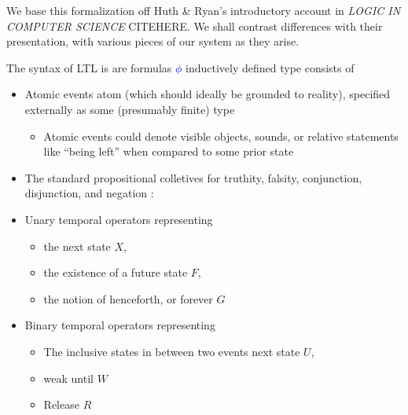 \documentclass[a4paper, 11pt]{article}
\newcommand{\blue}[1]{\textcolor{blue}{#1}}
\newcommand{\green}[1]{\textcolor{hooker\'sgreen}{#1}}
\begin{document}
We base this formalization off Huth \& Ryan's introductory account in
\emph{LOGIC IN COMPUTER SCIENCE} CITEHERE. We shall contrast differences with
their presentation, with various pieces of our system as they arise.

The syntax of LTL is are formulas \blue{$\phi$} inductively defined type consists of

\begin{itemize}
\item Atomic events \green{atom} (which should ideally be grounded to reality), specified externally as some (presumably finite) type
\begin{itemize}
\item Atomic events could denote visible objects, sounds, or relative statements like ``being left'' when compared to some prior state
\end{itemize}
\item The standard propositional colletives for truthity, falsity, conjunction, disjunction, and negation :
\item Unary temporal operators representing
\begin{itemize}
\item the next state \green{$X$},
\item the existence of a future state \green{$F$},
\item the notion of henceforth, or forever \green{$G$}
\end{itemize}
\item Binary temporal operators representing
\begin{itemize}
\item The inclusive states in between two events next state \green{$U$},
\item weak until \green{$W$}
\item Release \green{$R$}
\end{itemize}
\end{itemize}
\end{document}
